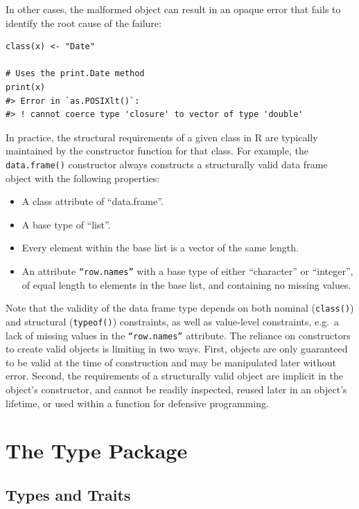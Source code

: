 In other cases, the malformed object can result in an opaque error that fails to identify the root cause of the failure:

\begin{verbatim}
class(x) <- "Date"

# Uses the print.Date method
print(x)
#> Error in `as.POSIXlt()`:
#> ! cannot coerce type 'closure' to vector of type 'double'
\end{verbatim}

In practice, the structural requirements of a given class in R are typically maintained by the constructor function for that class. For example, the \texttt{data.frame()} constructor always constructs a structurally valid data frame object with the following properties:

\begin{itemize}
\tightlist
\item
  A class attribute of ``data.frame''.
\item
  A base type of ``list''.
\item
  Every element within the base list is a vector of the same length.
\item
  An attribute \texttt{“row.names”} with a base type of either ``character'' or ``integer'', of equal length to elements in the base list, and containing no missing values.
\end{itemize}

Note that the validity of the data frame type depends on both nominal (\texttt{class()}) and structural (\texttt{typeof()}) constraints, as well as value-level constraints, e.g.~a lack of missing values in the \texttt{“row.names”} attribute. The reliance on constructors to create valid objects is limiting in two ways. First, objects are only guaranteed to be valid at the time of construction and may be manipulated later without error. Second, the requirements of a structurally valid object are implicit in the object's constructor, and cannot be readily inspected, reused later in an object's lifetime, or used within a function for defensive programming.

\section{The Type Package}\label{sec-type-package}

\subsection{Types and Traits}\label{sec-type-and-traits}

